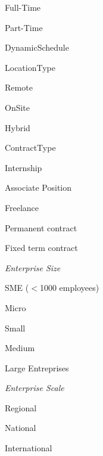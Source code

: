 \documentclass[english]{article}
\begin{document}
\begin{labelist}
\begin{labelist}
                \begin{labelist}
                    \item Full-Time
                    \item Part-Time
                    \item DynamicSchedule
                \end{labelist}
            \item LocationType
                \begin{labelist}
                    \item Remote
                    \item OnSite
                    \item Hybrid
                \end{labelist}
            \item ContractType
                \begin{labelist}
                    \item Internship
                    \item Associate Position
                    \item Freelance
                    \item Permanent contract
                    \item Fixed term contract
                \end{labelist}
        \end{labelist}
    \item 
        \textit{Enterprise Size} \cite{enterprise_size_ref}
        \begin{labelist}
            \item SME ($<$1000 employees)
                \begin{labelist}
                    \item Micro
                    \item Small
                    \item Medium
                \end{labelist}
            \item Large Entreprises
        \end{labelist}
    \item 
        \textit{Enterprise Scale}
        \begin{labelist}
            \item Regional
            \item National
            \item International

\end{labelist}
\end{labelist}
\end{document}
